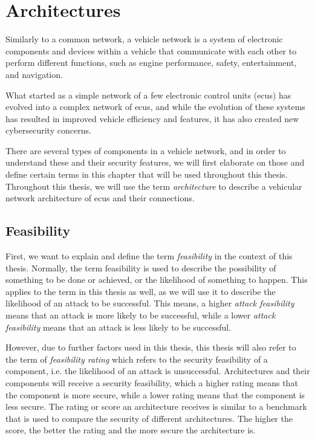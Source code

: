 \chapter{Architectures}
\label{chp:arch}

Similarly to a common network, a vehicle network is a system of electronic components and devices within a vehicle 
that communicate with each other to perform different functions, such as engine performance, safety, entertainment, and navigation. 

What started as a simple network of a few electronic control units (\gls{ecu}s) has evolved into a complex network of \gls{ecu}s,
and while the evolution of these systems has resulted in improved vehicle efficiency and features, 
it has also created new cybersecurity concerns.

There are several types of components in a vehicle network, and in order to understand these and their security features,
we will first elaborate on those and define certain terms in this chapter that will be used throughout this thesis.
Throughout this thesis, we will use the term \textit{architecture} to describe a vehicular network architecture of \gls{ecu}s and their connections.

\section{Feasibility}
\label{def:feasibility}

First, we want to explain and define the term \textit{feasibility} in the context of this thesis.
Normally, the term feasibility is used to describe the possibility of something to be done or achieved, or the likelihood of something to happen.
This applies to the term in this thesis as well, as we will use it to describe the likelihood of an attack to be successful.
This means, a higher \textit{attack feasibility} means that an attack is more likely to be successful, while a lower \textit{attack feasibility} means that an attack is less likely to be successful.

However, due to further factors used in this thesis, this thesis will also refer to the term of \textit{feasibility rating}
which refers to the security feasibility of a component, i.e. the likelihood of an attack is unsuccessful.
Architectures and their components will receive a security feasibility, which a higher rating means that the component is more secure, while a lower rating means that the component is less secure.
The rating or score an architecture receives is similar to a benchmark that is used to compare the security of different architectures.
The higher the score, the better the rating and the more secure the architecture is.

